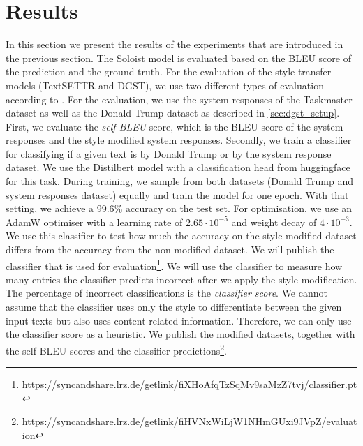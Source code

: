 \documentclass[twocolumn]{tum-article}
\begin{document}
\section{Results}
In this section we present the results of the experiments that are introduced in the previous section. The Soloist model is evaluated based on the BLEU score of the prediction and the ground truth. For the evaluation of the style transfer models (TextSETTR and DGST), we use two different types of evaluation according to \cite{riley2020textsettr}. For the evaluation, we use the system responses of the Taskmaster dataset as well as the Donald Trump dataset as described in \autoref{sec:dgst_setup}. First, we evaluate the \textit{self-BLEU} score, which is the BLEU score of the system responses and the style modified system responses. Secondly, we train a classifier for classifying if a given text is by Donald Trump or by the system response dataset. We use the Distilbert model \cite{sanh2019distilbert} with a classification head from huggingface for this task. During training, we sample from both datasets (Donald Trump and system responses dataset) equally and train the model for one epoch. With that setting, we achieve a $99.6\%$ accuracy on the test set. For optimisation, we use an AdamW optimiser \cite{loshchilov2017decoupled} with a learning rate of $2.65\cdot 10^{-5}$ and weight decay of $4\cdot 10^{-3}$. We use this classifier to test how much the accuracy on the style modified dataset differs from the accuracy from the non-modified dataset. We will publish the classifier that is used for evaluation\footnote{\url{https://syncandshare.lrz.de/getlink/fiXHoAfqTzSqMv9saMzZ7tvj/classifier.pt}}. We will use the classifier to measure how many entries the classifier predicts incorrect after we apply the style modification. The percentage of incorrect classifications is the \textit{classifier score}. We cannot assume that the classifier uses only the style to differentiate between the given input texts but also uses content related information. Therefore, we can only use the classifier score as a heuristic. We publish the modified datasets, together with the self-BLEU scores and the classifier predictions\footnote{\url{https://syncandshare.lrz.de/getlink/fiHVNxWiLjW1NHmGUxi9JVpZ/evaluation}}. 
\end{document}
